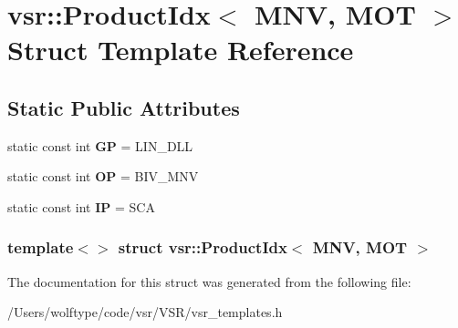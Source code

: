 \hypertarget{structvsr_1_1_product_idx_3_01_m_n_v_00_01_m_o_t_01_4}{\section{vsr\-:\-:Product\-Idx$<$ M\-N\-V, M\-O\-T $>$ Struct Template Reference}
\label{structvsr_1_1_product_idx_3_01_m_n_v_00_01_m_o_t_01_4}
}
\subsection*{Static Public Attributes}
\begin{DoxyCompactItemize}
\item 
\hypertarget{structvsr_1_1_product_idx_3_01_m_n_v_00_01_m_o_t_01_4_a24a72ee3e149bcae1e6f40d906673455}{static const int {\bfseries G\-P} = L\-I\-N\-\_\-\-D\-L\-L}\label{structvsr_1_1_product_idx_3_01_m_n_v_00_01_m_o_t_01_4_a24a72ee3e149bcae1e6f40d906673455}

\item 
\hypertarget{structvsr_1_1_product_idx_3_01_m_n_v_00_01_m_o_t_01_4_a5ae5c2218681547e043cfa3f930eb7ba}{static const int {\bfseries O\-P} = B\-I\-V\-\_\-\-M\-N\-V}\label{structvsr_1_1_product_idx_3_01_m_n_v_00_01_m_o_t_01_4_a5ae5c2218681547e043cfa3f930eb7ba}

\item 
\hypertarget{structvsr_1_1_product_idx_3_01_m_n_v_00_01_m_o_t_01_4_a83bcab607e473ec58e90fbf27d4a70eb}{static const int {\bfseries I\-P} = S\-C\-A}\label{structvsr_1_1_product_idx_3_01_m_n_v_00_01_m_o_t_01_4_a83bcab607e473ec58e90fbf27d4a70eb}

\end{DoxyCompactItemize}
\subsubsection*{template$<$$>$ struct vsr\-::\-Product\-Idx$<$ M\-N\-V, M\-O\-T $>$}



The documentation for this struct was generated from the following file\-:\begin{DoxyCompactItemize}
\item 
/\-Users/wolftype/code/vsr/\-V\-S\-R/vsr\-\_\-templates.\-h\end{DoxyCompactItemize}
